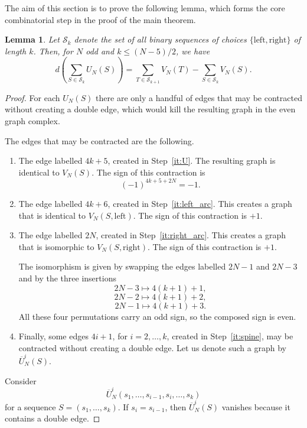 \documentclass[11pt]{article}
\theoremstyle{definition}
\theoremstyle{plain}
\newtheorem{lemma}[definition]{Lemma}
\newcommand{\LeftChoice}{\mathrm{left}}
\newcommand{\RightChoice}{\mathrm{right}}
\begin{document}
The aim of this section is to prove the following lemma, which forms the core combinatorial step in the proof of the main theorem.
\begin{lemma}\label{lem:differential-UN}
Let $\mathcal{S}_k$ denote the set of all binary sequences of choices $\{\LeftChoice, \RightChoice\}$ of length $k$.
Then, for $N$ odd and $k\le(N-5)/2$, we have
\[
 d \left(\sum_{S \in \mathcal{S}_k} U_N(S) \right)
 = \sum_{T \in \mathcal{S}_{k+1}} V_N(T) - \sum_{S \in \mathcal{S}_k} V_N(S).
\]
\end{lemma}

\begin{proof}
For each $U_N(S)$ there are only a handful of edges that may be contracted without creating a double edge, which would kill the resulting graph in the even graph complex.

The edges that may be contracted are the following.
\begin{enumerate}[itemsep=0.35em, topsep=0.35em]
\item The edge labelled $4k+5$, created in Step~\ref{it:U}. The resulting graph is identical to $V_N(S)$. The sign of this contraction is
\[
(-1)^{4k+5+2N} = -1.
\]

\item The edge labelled $4k+6$, created in Step~\ref{it:left_arc}. This creates a graph that is identical to $V_N(S,\LeftChoice)$. The sign of this contraction is $+1$.

\item The edge labelled $2N$, created in Step~\ref{it:right_arc}. This creates a graph that is isomorphic to $V_N(S,\RightChoice)$. The sign of this contraction is $+1$.

The isomorphism is given by swapping the edges labelled $2N-1$ and $2N-3$ and by the three insertions
\[
2N-3 \mapsto 4(k+1)+1,
\]
\[
2N-2 \mapsto 4(k+1)+2,
\]
\[
2N-1 \mapsto 4(k+1)+3.
\]
All these four permutations carry an odd sign, so the composed sign is even.

\item Finally, some edges $4i+1$, for $i=2,\dots,k$, created in Step~\ref{it:spine}, may be contracted without creating a double edge. Let us denote such a graph by $\overline{U}_N^i(S)$.
\end{enumerate}

Consider
\[
\overline{U}_N^i(s_1,\dots,s_{i-1},s_i,\dots,s_k)
\]
for a sequence $S=(s_1,\dots,s_k)$. If $s_i=s_{i-1}$, then $\overline{U}_N^i(S)$ vanishes because it contains a double edge.


\end{proof}
\end{document}
